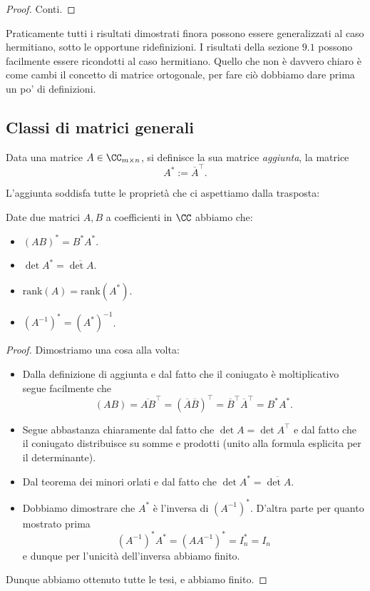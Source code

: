 \documentclass[11pt]{scrartcl}
\renewcommand{\rank}[1]{\text{rank}\!\left(#1\right)}
\begin{document}
   	 \begin{proof}
   	 	Conti.
   	 \end{proof}
   	 Praticamente tutti i risultati dimostrati finora possono essere generalizzati al caso hermitiano, sotto le opportune ridefinizioni. I risultati della sezione $9.1$ possono facilmente essere ricondotti al caso hermitiano. Quello che non è davvero chiaro è come cambi il concetto di matrice ortogonale, per fare ciò dobbiamo dare prima un po' di definizioni.
   	 
   	 \subsection{Classi di matrici generali}
   	 
   	 \begin{definition}
   	 	Data una matrice $A\in\CC_{m\times n}$, si definisce la sua matrice \textit{aggiunta}, la matrice $$A^*:=\overline{A}^\intercal.$$ 
   	 \end{definition}
   	 L'aggiunta soddisfa tutte le proprietà che ci aspettiamo dalla trasposta:
   	 \begin{lemma}
   	 	Date due matrici $A,B$ a coefficienti in $\CC$ abbiamo che:
   	 	\begin{itemize}
   	 		\item $\left(AB\right)^*=B^*A^*$.
   	 		\item $\det A^*=\overline{\det A}$.
   	 		\item $\rank{A}=\rank{A^*}$.
   	 		\item $\left(A^{-1}\right)^*=\left(A^*\right)^{-1}$.
   	 	\end{itemize} 
   	 \end{lemma}
   	 \begin{proof}
   	 	Dimostriamo una cosa alla volta:
   	 	\begin{itemize}
   	 		\item Dalla definizione di aggiunta e dal fatto che il coniugato è moltiplicativo segue facilmente che
   	 		$$\left(AB\right)=\overline{AB}^\intercal=\left(\overline{A}\overline{B}\right)^\intercal=\overline{B}^\intercal \overline{A}^\intercal=B^*A^*.$$
   	 		\item Segue abbastanza chiaramente dal fatto che $\det A=\det A^\intercal$ e dal fatto che il coniugato distribuisce su somme e prodotti (unito alla formula esplicita per il determinante).
   	 		\item Dal teorema dei minori orlati e dal fatto che $\det A^*=\overline{\det A}$.
   	 		\item Dobbiamo dimostrare che $A^*$ è l'inversa di $\left(A^{-1}\right)^*$. D'altra parte per quanto mostrato prima
   	 		$$\left(A^{-1}\right)^*A^*=\left(AA^{-1}\right)^*=I_n^*=I_n$$
   	 		e dunque per l'unicità dell'inversa abbiamo finito.
   	 	\end{itemize}
   	 	Dunque abbiamo ottenuto tutte le tesi, e abbiamo finito.
   	 \end{proof}
   	 
\end{document}
